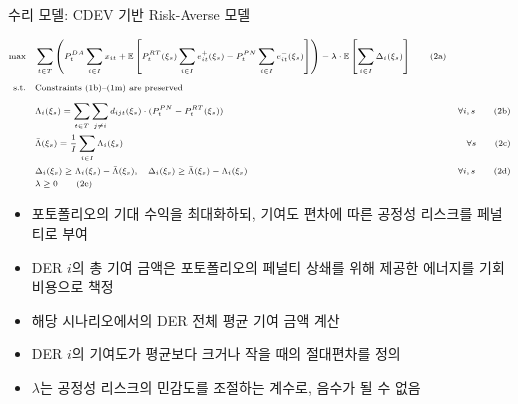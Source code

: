 \documentclass[xcolor=dvipsnames,t,9pt]{beamer}
\begin{document}

\begin{frame}{수리 모델: CDEV 기반 Risk-Averse 모델}
    \vspace{-1em}
    \begin{block}{}
        \vspace{-1em}
        \begin{subequations}
            \scriptsize
            \begin{flalign}
                \text{max} \quad
                 & \sum_{t \in T} \left(
                P_t^{DA} \sum_{i \in I} x_{it}
                + \mathbb{E}\left[
                P_t^{RT}(\xi_s) \sum_{i \in I} e^+_{it}(\xi_s)
                - P_t^{PN} \sum_{i \in I} e^-_{it}(\xi_s)
                \right]
                \right)
                - \lambda \cdot \mathbb{E} \left[ \sum_{i \in I} \Delta_i(\xi_s) \right]                                             \tag{2a}                             \\[0.5em]
                \text{s.t.} \quad
                 & \text{Constraints (1b)--(1m) are preserved} \nonumber                                                                                                  \\[0.5em]
                 & \Lambda_i(\xi_s) = \sum_{t \in T} \sum_{j \ne i} d_{ijt}(\xi_s) \cdot (P_t^{PN} - P_t^{RT}(\xi_s))                             & \forall i, s \tag{2b} \\
                 & \bar{\Lambda}(\xi_s) = \frac{1}{I} \sum_{i \in I} \Lambda_i(\xi_s)                                                             & \forall s   \tag{2c}  \\
                 & \Delta_i(\xi_s) \ge \Lambda_i(\xi_s) - \bar{\Lambda}(\xi_s), \quad \Delta_i(\xi_s) \ge \bar{\Lambda}(\xi_s) - \Lambda_i(\xi_s) & \forall i, s \tag{2d} \\
                 & \lambda \ge 0                      \tag{2e}                                                                                    &
            \end{flalign}
        \end{subequations}
    \end{block}
    \small
    \begin{itemize}
        \item[(2a)] 포토폴리오의 기대 수익을 최대화하되, 기여도 편차에 따른 공정성 리스크를 페널티로 부여
        \item[(2b)] DER $i$의 총 기여 금액은 포토폴리오의 페널티 상쇄를 위해 제공한 에너지를 기회비용으로 책정
        \item[(2c)] 해당 시나리오에서의 DER 전체 평균 기여 금액 계산
        \item[(2d)] DER $i$의 기여도가 평균보다 크거나 작을 때의 절대편차를 정의
        \item[(2e)] $\lambda$는 공정성 리스크의 민감도를 조절하는 계수로, 음수가 될 수 없음
    \end{itemize}
\end{frame}
\end{document}
